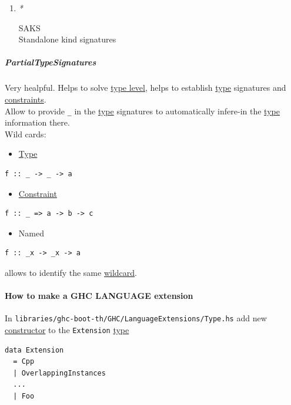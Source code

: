 \documentclass[11pt]{article}
\begin{document}
\begin{enumerate}
\item \emph{*}
\label{sec:org14585e9}

\label{orgdb7e1ff}SAKS\\
\label{org4f75fec}Standalone kind signatures\\
\end{enumerate}

\subparagraph{\label{org97d995a}PartialTypeSignatures}
\label{sec:org0ec71ec}
Very healpful. Helps to solve \hyperref[orgfe4cf3f]{type level}, helps to establish \hyperref[orgc4aea2f]{type} signatures and \hyperref[orgcddf7a9]{constraints}.\\
Allow to provide \texttt{\_} in the \hyperref[orgc4aea2f]{type} signatures to automatically infere-in the \hyperref[orgc4aea2f]{type} information there.\\

Wild cards:\\
\begin{itemize}
\item \hyperref[orgc4aea2f]{Type}\\
\end{itemize}
\begin{verbatim}
f :: _ -> _ -> a
\end{verbatim}

\begin{itemize}
\item \hyperref[org180980d]{Constraint}\\
\end{itemize}
\begin{verbatim}
f :: _ => a -> b -> c
\end{verbatim}

\begin{itemize}
\item Named\\
\end{itemize}
\begin{verbatim}
f :: _x -> _x -> a
\end{verbatim}
allows to identify the same \hyperref[orgdf69265]{wildcard}.\\

\paragraph{How to make a GHC LANGUAGE extension}
\label{sec:orga6aa790}

In \texttt{libraries/ghc-boot-th/GHC/LanguageExtensions/Type.hs} add new \hyperref[orgf4d811d]{constructor} to the \texttt{Extension} \hyperref[orgc4aea2f]{type}\\
\begin{verbatim}
data Extension
  = Cpp
  | OverlappingInstances
  ...
  | Foo
\end{verbatim}
\end{document}
